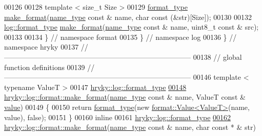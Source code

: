 \begin{DoxyCode}
00126 
00128     \textcolor{keyword}{template} < \textcolor{keywordtype}{size\_t} Size >
00129     \hyperlink{classhryky_1_1_intrusive_ptr}{format_type} \hyperlink{namespacehryky_1_1log_1_1format_ae8ca636c4b89fe300287aca4f870f2ef}{make_format}(\hyperlink{namespacehryky_1_1log_1_1format_ab7408d1e2ed2d648dbf9bba69eb74288}{name_type} \textcolor{keyword}{const} & name, \textcolor{keywordtype}{char} \textcolor{keyword}{const} (&str)[Size]);
00130 
00132     \hyperlink{classhryky_1_1_intrusive_ptr}{log::format_type} \hyperlink{namespacehryky_1_1log_1_1format_ae8ca636c4b89fe300287aca4f870f2ef}{make_format}(\hyperlink{namespacehryky_1_1log_1_1format_ab7408d1e2ed2d648dbf9bba69eb74288}{name_type} \textcolor{keyword}{const} & name, uint8\_t \textcolor{keyword}{const} & src);
00133 
00134 \} \textcolor{comment}{// namespace format}
00135 \} \textcolor{comment}{// namespace log}
00136 \} \textcolor{comment}{// namespace hryky}
00137 \textcolor{comment}{//
      ------------------------------------------------------------------------------}
00138 \textcolor{comment}{// global function definitions}
00139 \textcolor{comment}{//
      ------------------------------------------------------------------------------}
00146 \textcolor{comment}{}\textcolor{keyword}{template} < \textcolor{keyword}{typename} ValueT >
00147 \hyperlink{classhryky_1_1_intrusive_ptr}{hryky::log::format_type}
\hypertarget{log__format__value_8h_source_l00148}{}\hyperlink{namespacehryky_1_1log_1_1format_ae8ca636c4b89fe300287aca4f870f2ef}{00148} \hyperlink{namespacehryky_1_1log_1_1format_ae8ca636c4b89fe300287aca4f870f2ef}{hryky::log::format::make_format}(\hyperlink{namespacehryky_1_1log_1_1format_ab7408d1e2ed2d648dbf9bba69eb74288}{name_type} \textcolor{keyword}{const} & name, ValueT \textcolor{keyword}{const} & \hyperlink{namespacehryky_1_1log_1_1format_a5b9af9c1a7b018d54144acfb1b8cc960}{value})
00149 \{
00150     \textcolor{keywordflow}{return} \hyperlink{namespacehryky_1_1log_ad50448c3f934f1eacd5c1bcffe8111e1}{format_type}(\textcolor{keyword}{new} \hyperlink{classhryky_1_1log_1_1format_1_1_value}{format::Value<ValueT>}(name, value), \textcolor{keyword}{false});
00151 \}
00160 \textcolor{keyword}{inline}
00161 \hyperlink{classhryky_1_1_intrusive_ptr}{hryky::log::format_type}
\hypertarget{log__format__value_8h_source_l00162}{}\hyperlink{namespacehryky_1_1log_1_1format_af9b4a13bd0f7d9d1f4d7d78dc89b3f86}{00162} \hyperlink{namespacehryky_1_1log_1_1format_ae8ca636c4b89fe300287aca4f870f2ef}{hryky::log::format::make_format}(\hyperlink{namespacehryky_1_1log_1_1format_ab7408d1e2ed2d648dbf9bba69eb74288}{name_type} \textcolor{keyword}{const} & name, \textcolor{keywordtype}{char} \textcolor{keyword}{const} * & str)

\end{DoxyCode}

